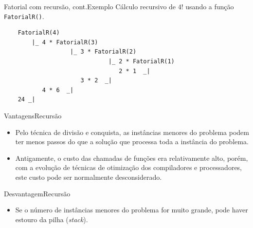 \begin{frame}[fragile]{Fatorial com recursão, cont.}{Exemplo}
  Cálculo recursivo de $4!$ usando a função {\tt FatorialR()}.
  
  \bigskip
  \begin{lstlisting}
    FatorialR(4)
        |_ 4 * FatorialR(3)
                   |_ 3 * FatorialR(2)
                              |_ 2 * FatorialR(1)
                                 2 * 1  _|
                      3 * 2  _|
           4 * 6  _|
    24 _|
  \end{lstlisting}
\end{frame}

\begin{frame}{Vantagens}{Recursão}
  \begin{itemize}
  \item Pelo técnica de divisão e conquista, as instâncias menores do
    problema podem ter menos passos do que a solução que processa toda
    a instância do problema.
    \pause
  \item Antigamente, o custo das chamadas de funções era relativamente
    alto, porém, com a evolução de técnicas de otimização dos
    compiladores e processadores, este custo pode ser normalmente 
    desconsiderado.
  \end{itemize}
\end{frame}

\begin{frame}{Desvantagem}{Recursão}  
  \begin{itemize}
  \item Se o número de instâncias menores do problema for muito grande, 
    pode haver estouro da pilha ({\it stack}).
  \end{itemize}
  
\end{frame}